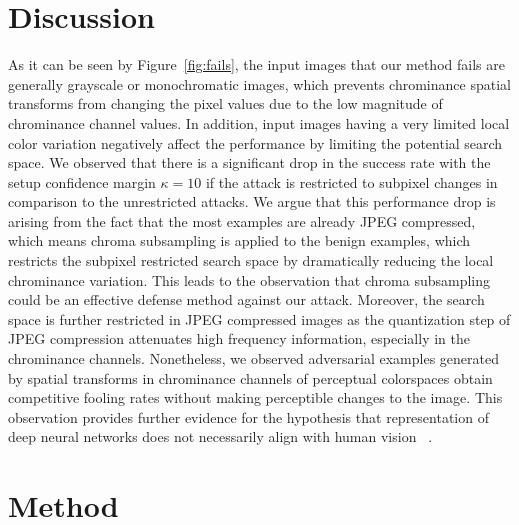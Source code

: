 \section{Discussion}\label{section:discussion}
As it can be seen by Figure~\ref{fig:fails}, the input images that our method fails are generally grayscale or monochromatic images, which prevents chrominance spatial transforms from changing the pixel values due to the low magnitude of chrominance channel values. In addition, input images having a very limited local color variation negatively affect the performance by limiting the potential search space. We observed that there is a significant drop in the success rate with the setup confidence margin \(\kappa=10\) if the attack is restricted to subpixel changes in comparison to the unrestricted attacks. We argue that this performance drop is arising from the fact that the most examples are already JPEG compressed, which means chroma subsampling is applied to the benign examples, which restricts the subpixel restricted search space by dramatically reducing the local chrominance variation. This leads to the observation that chroma subsampling could be an effective defense method against our attack. Moreover, the search space is further restricted in JPEG compressed images as the quantization step of JPEG compression attenuates high frequency information, especially in the chrominance channels. Nonetheless, we observed adversarial examples generated by spatial transforms in chrominance channels of perceptual colorspaces obtain competitive fooling rates without making perceptible changes to the image. This observation provides further evidence for the hypothesis that representation of deep neural networks does not necessarily align with human vision ~\cite{geirhos2018imagenet}.


\section{Method}